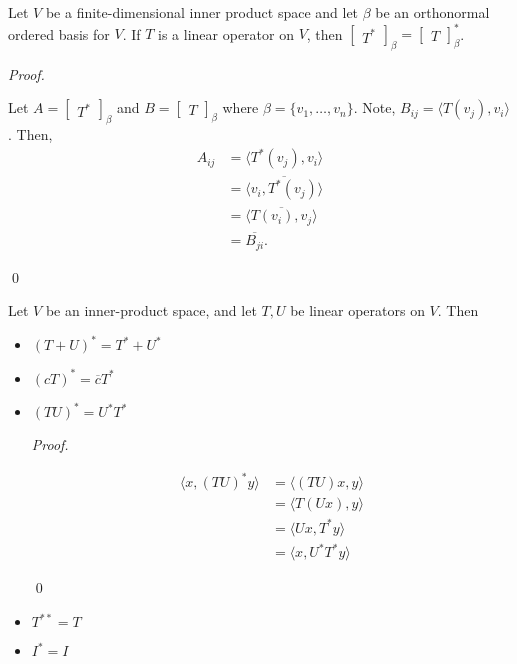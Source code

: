 \documentclass[12pt]{article}
\newenvironment{theorem}[2][Theorem]{\begin{trivlist}
\item[\hskip \labelsep {\bfseries #1}\hskip \labelsep {\bfseries #2.}]}{\end{trivlist}}
\newenvironment{sol}
    {\emph{Proof.}
    }
    {
    \qed
    }
\begin{document}
\begin{theorem}{6.10}
Let $V$ be a finite-dimensional inner product space and let $\beta$ be an orthonormal ordered basis for $V$. If $T$ is a linear operator on $V$, then $\begin{bmatrix}
T^*
\end{bmatrix}_\beta = \begin{bmatrix}
T
\end{bmatrix}_\beta^*$.
\end{theorem}

\begin{sol}
Let $A = \begin{bmatrix}
T^*
\end{bmatrix}_\beta$ and $B = \begin{bmatrix}
T
\end{bmatrix}_\beta$ where $\beta = \{v_1, \dots, v_n\}$. Note, $B_{ij} = \langle T(v_j), v_i \rangle$. Then, \begin{align*}
    A_{ij} &= \langle T^*(v_j), v_i \rangle \\
    &= \overline{ \langle v_i, T^*(v_j) \rangle} \\
    &= \overline{\langle T(v_i), v_j \rangle} \\
    &= \overline{B_{ji}}.
\end{align*}
\end{sol}

\begin{theorem}{6.11}
Let $V$ be an inner-product space, and let $T,U$ be linear operators on $V$. Then

\begin{itemize}
    \item[(a)] $(T + U)^* = T^* + U^*$
    
    \item[(b)] $(cT)^* = \overline{c}T^*$
    
    \item[(c)] $(TU)^* = U^*T^*$
    
    \begin{sol}
    \begin{align*}
        \langle x, (TU)^*y \rangle &= \langle (TU)x, y \rangle \\
        &= \langle T(Ux), y \rangle \\
        &= \langle Ux, T^*y \rangle \\
        &= \langle x, U^*T^*y \rangle
    \end{align*}
    \end{sol}
    
    \item[(d)] $T^{**} = T$
    
    \item[(e)] $I^* = I$
\end{itemize}
\end{theorem}
\end{document}
